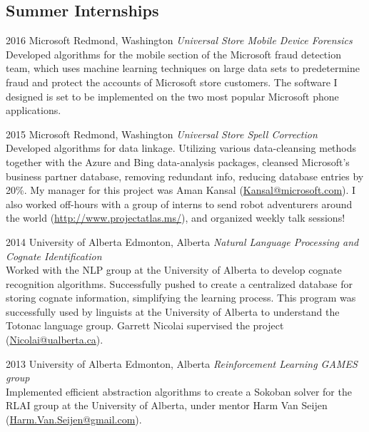 \documentclass{friggeri-cv} %
\begin{document}
\pagebreak[4]
\subsection{Summer Internships}

\begin{entrylist}


\entry
{2016}
{Microsoft}
{Redmond, Washington}
{\emph{Universal Store Mobile Device Forensics} \\
Developed algorithms for the mobile section of the Microsoft fraud detection team, which uses machine learning techniques on large data sets to predetermine fraud and protect the accounts of Microsoft store customers. The software I designed is set to be implemented on the two most popular Microsoft phone applications. }


\entry
{2015}
{Microsoft}
{Redmond, Washington}
{\emph{Universal Store Spell Correction} \\
Developed algorithms for data linkage. Utilizing various data-cleansing methods together with the Azure and Bing data-analysis packages, cleansed Microsoft's business partner database, removing redundant info, reducing database entries by 20\%. My manager for this project was Aman Kansal (\href{mailto:Kansal@microsoft.com}{Kansal@microsoft.com}). I also worked off-hours with a group of interns to send robot adventurers around the world (\href{http://www.projectatlas.ms/}{http://www.projectatlas.ms/}), and organized weekly talk sessions!}


\entry
{2014}
{University of Alberta}
{Edmonton, Alberta}
{\emph{Natural Language Processing and Cognate Identification} \\
Worked with the NLP group at the University of Alberta to develop cognate recognition algorithms. Successfully pushed to create a centralized database for storing cognate information, simplifying the learning process. This program was successfully used by linguists at the University of Alberta to understand the Totonac language group. Garrett Nicolai supervised the project (\href{mailto:Nicolai@ualberta.ca}{Nicolai@ualberta.ca}).}


\entry
{2013}
{University of Alberta}
{Edmonton, Alberta}
{\emph{Reinforcement Learning GAMES group} \\
Implemented efficient abstraction algorithms to create a Sokoban solver for the RLAI group at the University of Alberta, under mentor Harm Van Seijen (\href{mailto:Harm.Van.Seijen@gmail.com}{Harm.Van.Seijen@gmail.com}).}


\end{entrylist}
\end{document}
